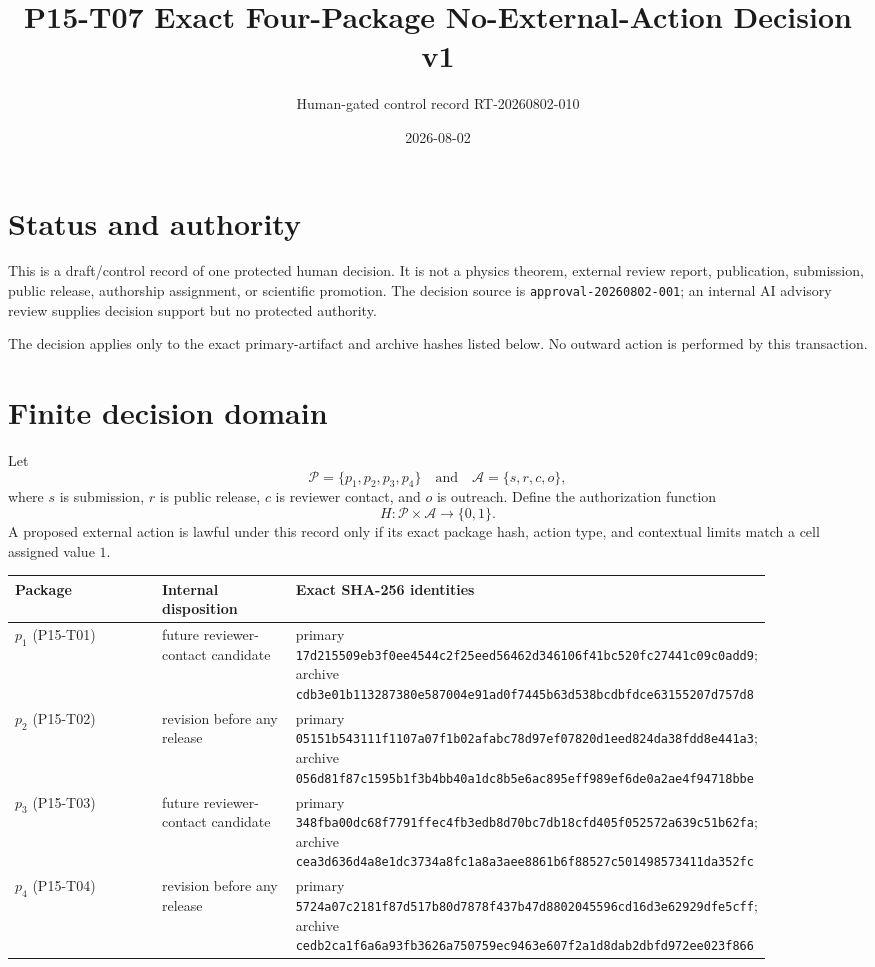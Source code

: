 \documentclass[11pt]{article}
\title{P15-T07 Exact Four-Package No-External-Action Decision v1}
\author{Human-gated control record RT-20260802-010}
\date{2026-08-02}
\newcommand{\Packages}{\mathcal{P}}
\newcommand{\Actions}{\mathcal{A}}
\newcommand{\Auth}{H}
\begin{document}
\maketitle

\section{Status and authority}

This is a draft/control record of one protected human decision. It is not a
physics theorem, external review report, publication, submission, public
release, authorship assignment, or scientific promotion. The decision source
is \texttt{approval-20260802-001}; an internal AI advisory review supplies
decision support but no protected authority.

The decision applies only to the exact primary-artifact and archive hashes
listed below. No outward action is performed by this transaction.

\section{Finite decision domain}

Let
\[
\Packages=\{p_1,p_2,p_3,p_4\}
\quad\text{and}\quad
\Actions=\{s,r,c,o\},
\]
where $s$ is submission, $r$ is public release, $c$ is reviewer contact, and
$o$ is outreach. Define the authorization function
\[
\Auth:\Packages\times\Actions\longrightarrow\{0,1\}.
\]
A proposed external action is lawful under this record only if its exact
package hash, action type, and contextual limits match a cell assigned value
$1$.

\begin{longtable}{p{0.20\linewidth}p{0.18\linewidth}p{0.50\linewidth}}
\toprule
Package & Internal disposition & Exact SHA-256 identities \\
\midrule
$p_1$ (P15-T01) & future reviewer-contact candidate & primary
\texttt{17d215509eb3f0ee4544c2f25eed56462d346106f41bc520fc27441c09c0add9};
archive \texttt{cdb3e01b113287380e587004e91ad0f7445b63d538bcdbfdce63155207d757d8} \\
$p_2$ (P15-T02) & revision before any release & primary
\texttt{05151b543111f1107a07f1b02afabc78d97ef07820d1eed824da38fdd8e441a3};
archive \texttt{056d81f87c1595b1f3b4bb40a1dc8b5e6ac895eff989ef6de0a2ae4f94718bbe} \\
$p_3$ (P15-T03) & future reviewer-contact candidate & primary
\texttt{348fba00dc68f7791ffec4fb3edb8d70bc7db18cfd405f052572a639c51b62fa};
archive \texttt{cea3d636d4a8e1dc3734a8fc1a8a3aee8861b6f88527c501498573411da352fc} \\
$p_4$ (P15-T04) & revision before any release & primary
\texttt{5724a07c2181f87d517b80d7878f437b47d8802045596cd16d3e62929dfe5cff};
archive \texttt{cedb2ca1f6a6a93fb3626a750759ec9463e607f2a1d8dab2dbfd972ee023f866} \\
\bottomrule
\end{longtable}
\end{document}
